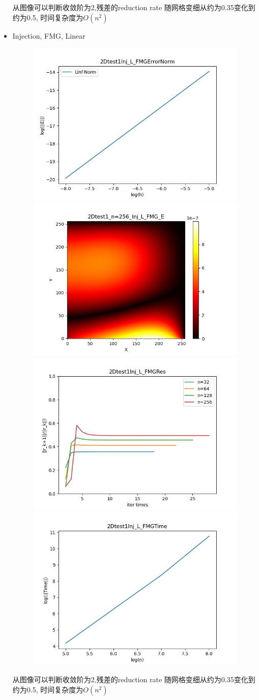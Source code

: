 \documentclass{article}
\begin{document}
\begin{itemize}
    从图像可以判断收敛阶为2,残差的reduction rate 随网格变细从约为0.35变化到约为0.5, 时间复杂度为$O(n^2)$
    \newpage
    \item Injection, FMG, Linear
    \begin{figure}[h]
        \centering
        \includegraphics[width=0.35\linewidth]{2Dtest1Inj_L_FMGErrorNorm.jpg}
        \includegraphics[width=0.35\linewidth]{2Dtest1_n=256_Inj_L_FMG_E.jpg}
        \includegraphics[width=0.35\linewidth]{2Dtest1Inj_L_FMGRes.jpg}
        \includegraphics[width=0.35\linewidth]{2Dtest1Inj_L_FMGTime.jpg}
    \end{figure}
    
    从图像可以判断收敛阶为2,残差的reduction rate 随网格变细从约为0.35变化到约为0.5, 时间复杂度为$O(n^2)$


\end{itemize}
\end{document}
